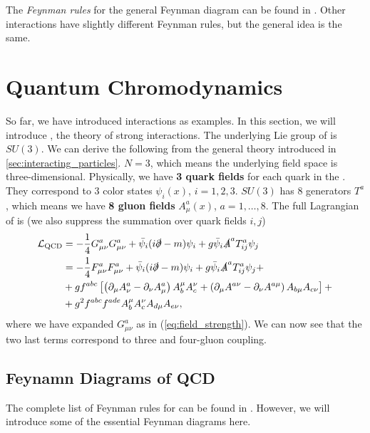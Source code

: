 The \emph{Feynman rules} for the general \QED Feynman diagram can be found in \cite{intro_to_part}.
Other interactions have slightly different Feynman rules, but the general idea is the same.


\section{Quantum Chromodynamics}
\label{sec:QCD}
So far, we have introduced \QED interactions as examples. 
In this section, we will introduce \QCD, the theory of strong interactions.
The underlying Lie group of \QCD is  $SU(3)$.
We can derive the following from the general theory introduced in \cref{sec:interacting_particles}. 
$N=3$, which means the underlying field space is three-dimensional.
Physically, we have \textbf{3 quark fields} for each quark in the \SM.
They correspond to 3 color states $\psi_i(x)$, $i=1,2,3$.
$SU(3)$ has 8 generators $T^a$, which means we have \textbf{8 gluon fields} $A^a_\mu(x)$, $a=1,\dots, 8$.
The full Lagrangian of \QCD is \cite{qcd} (we also suppress the summation over quark fields $i,j$)
\begin{align}
\begin{split}
    \label{eq:qcd_lag}
    \mathcal{L}_{\text{QCD}}  &= - \frac{1}{4}  G^a_{\mu\nu} G^a_{\mu\nu}  + \bar{\psi}_i (i \slashed{\partial} - m ) \psi_i + g \bar{\psi}_i \slashed{A}^a T^a_{ij} \psi_j \\
     &= - \frac{1}{4}  F^a_{\mu\nu} F^a_{\mu\nu}  + \bar{\psi}_i (i \slashed{\partial} - m ) \psi_i + g \bar{\psi}_i \slashed{A}^a T^a_{ij} \psi_j + \\    
     &+ g f^{a b c}\left[\left(\partial_\mu A_\nu^a-\partial_\nu A_\mu^a\right) A_b^\mu A_c^\nu+\left(\partial_\mu A^{a\nu}-\partial_\nu A^{a \mu}\right) A_{b \mu} A_{c \nu}\right] + \\
     &+ g^2 f^{a b c} f^{a d e} A_b^\mu A_c^\nu A_{d \mu} A_{e \nu},
\end{split}
\end{align}
where we have expanded $G^a_{\mu\nu}$ as in (\ref{eq:field_strength}). 
We can now see that the two last terms correspond to three and four-gluon coupling.


\subsection{Feynamn Diagrams of QCD}
The complete list of Feynman rules for \QCD can be found in \cite{qcd}.
However, we will introduce some of the essential Feynman diagrams here.

